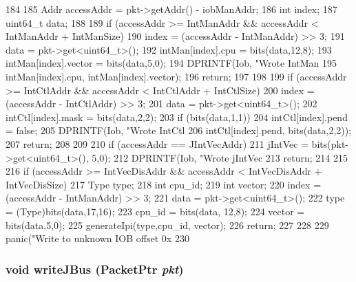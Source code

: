 \begin{DoxyCode}
184 {
185         Addr accessAddr = pkt->getAddr() - iobManAddr;
186         int index;
187         uint64_t data;
188 
189         if (accessAddr >= IntManAddr && accessAddr < IntManAddr + IntManSize) {
190             index = (accessAddr - IntManAddr) >> 3;
191             data = pkt->get<uint64_t>();
192             intMan[index].cpu = bits(data,12,8);
193             intMan[index].vector = bits(data,5,0);
194             DPRINTF(Iob, "Wrote IntMan %
195                     intMan[index].cpu, intMan[index].vector);
196             return;
197         }
198 
199         if (accessAddr >= IntCtlAddr && accessAddr < IntCtlAddr + IntCtlSize) {
200             index = (accessAddr - IntCtlAddr) >> 3;
201             data = pkt->get<uint64_t>();
202             intCtl[index].mask = bits(data,2,2);
203             if (bits(data,1,1))
204                 intCtl[index].pend = false;
205             DPRINTF(Iob, "Wrote IntCtl %
206                     intCtl[index].pend, bits(data,2,2));
207             return;
208         }
209 
210         if (accessAddr == JIntVecAddr) {
211             jIntVec = bits(pkt->get<uint64_t>(), 5,0);
212             DPRINTF(Iob, "Wrote jIntVec %
213             return;
214         }
215 
216         if (accessAddr >= IntVecDisAddr && accessAddr < IntVecDisAddr + 
      IntVecDisSize) {
217             Type type;
218             int cpu_id;
219             int vector;
220             index = (accessAddr - IntManAddr) >> 3;
221             data = pkt->get<uint64_t>();
222             type = (Type)bits(data,17,16);
223             cpu_id = bits(data, 12,8);
224             vector = bits(data,5,0);
225             generateIpi(type,cpu_id, vector);
226             return;
227         }
228 
229         panic("Write to unknown IOB offset 0x%
230 }
\end{DoxyCode}
\hypertarget{classIob_adfe6eb5eebb6cfad3bd50b969ef744c6}{
\subsubsection[{writeJBus}]{\setlength{\rightskip}{0pt plus 5cm}void writeJBus ({\bf PacketPtr} {\em pkt})}}
\label{classIob_adfe6eb5eebb6cfad3bd50b969ef744c6}



